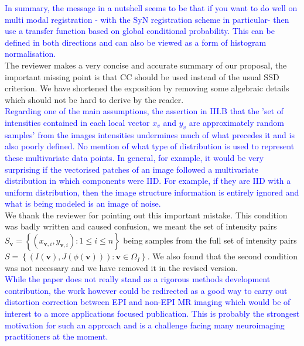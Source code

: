 \documentclass[onecolumn]{IEEEtran}
\begin{document}
\textcolor{blue}{In summary, the message in a nutshell seems to be that if you want to do well on multi modal registration - with the SyN registration scheme in particular- then use a transfer function based on global conditional probability. This can be defined in both directions and can also be viewed as a form of histogram normalisation.}\\

The reviewer makes a very concise and accurate summary of our proposal, the important missing point is that CC should be used instead of the usual SSD criterion. We have shortened the exposition by removing some algebraic details which should not be hard to derive by the reader.\\

\textcolor{blue}{Regarding one of the main assumptions, the assertion in III.B that the 'set of intensities contained in each local vector $x_v$ and $y_v$ are approximately random samples' from the images intensities undermines much of what precedes it and is also poorly defined. No mention of what type of distribution is used to represent these multivariate data points. In general, for example, it would be very surprising if the vectorised patches of an image followed a multivariate distribution in which components were IID. For example, if they are IID with a uniform distribution, then the image structure information is entirely ignored and what is being modeled is an image of noise.}\\

We thank the reviewer for pointing out this important mistake. This condition was badly written and caused confusion, we meant the set of intensity pairs $S_{\mathbf{v}}=\left\lbrace \left(x_{\mathbf{v}, i}, y_{\mathbf{v}, i}\right): 1\leq i \leq n\right\rbrace$ being samples from the full set of intensity pairs $S=\left\lbrace \left(I(\mathbf{v}), J(\phi(\mathbf{v}))\right): \mathbf{v}\in \Omega_{I}\right\rbrace$. We also found that the second condition was not necessary and we have removed it in the revised version.\\

\textcolor{blue}{While the paper does not really stand as a rigorous methods development contribution, the work however could be redirected as a good way to carry out distortion correction between EPI and non-EPI MR imaging which would be of interest to a more applications focused publication. This is probably the strongest motivation for such an approach and is a challenge facing many neuroimaging practitioners at the moment.}\\
\end{document}
